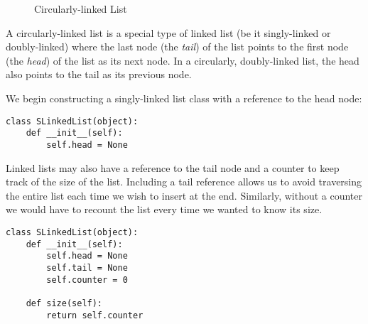 \begin{figure}
\centering
{}
\caption{Circularly-linked List}
\end{figure}
A circularly-linked list is a special type of linked list (be it singly-linked or doubly-linked) where the last node (the \emph{tail}) of the list points to the first node (the \emph{head}) of the list as its next node.
In a circularly, doubly-linked list, the head also points to the tail as its previous node.

We begin constructing a singly-linked list class with a reference to the head node:
\begin{lstlisting}
class SLinkedList(object):
    def __init__(self):
        self.head = None
\end{lstlisting}

Linked lists may also have a reference to the tail node and a counter to keep track of the size of the list.
Including a tail reference allows us to avoid traversing the entire list each time we wish to insert at the end.
Similarly, without a counter we would have to recount the list every time we wanted to know its size.
\begin{lstlisting}
class SLinkedList(object):
    def __init__(self):
        self.head = None
        self.tail = None
        self.counter = 0

    def size(self):
        return self.counter
\end{lstlisting}

